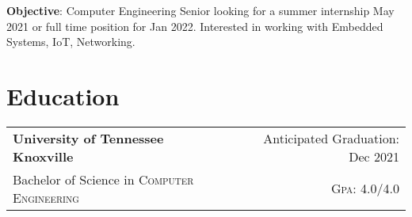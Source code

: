 \documentclass[a4paper,11pt]{article}
\begin{document}

\pagestyle{empty} %

\par{ \smallskip
\par{\textbf{Objective}: Computer Engineering Senior looking for a summer internship May 2021 or full time position for Jan 2022.
Interested in working with Embedded Systems, IoT, Networking.
}\smallskip}



\section{Education}
\begin{tabularx}{\textwidth}{lXr}
   \textbf{University of Tennessee Knoxville} & & Anticipated Graduation: Dec 2021\\
   Bachelor of Science in \textsc{Computer Engineering} &  & \normalsize \textsc{Gpa}: 4.0/4.0\\
\end{tabularx}
\end{document}
